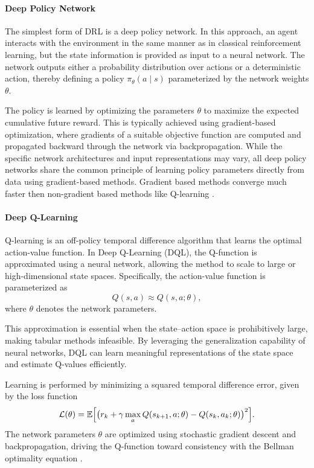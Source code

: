 \paragraph{Deep Policy Network}
The simplest form of DRL is a deep policy network. In this approach, an agent interacts with the environment in the same manner as in classical reinforcement learning, but the state information is provided as input to a neural network. The network outputs either a probability distribution over actions or a deterministic action, thereby defining a policy \( \pi_\theta(a \mid s) \) parameterized by the network weights \( \theta \).

The policy is learned by optimizing the parameters \( \theta \) to maximize the expected cumulative future reward. This is typically achieved using gradient-based optimization, where gradients of a suitable objective function are computed and propagated backward through the network via backpropagation. While the specific network architectures and input representations may vary, all deep policy networks share the common principle of learning policy parameters directly from data using gradient-based methods. Gradient based methods converge much faster then non-gradient based methods like Q-learning \cite{brunton2022data}.

\paragraph{Deep Q-Learning}
Q-learning is an off-policy temporal difference algorithm that learns the optimal action-value function. In Deep Q-Learning (DQL), the Q-function is approximated using a neural network, allowing the method to scale to large or high-dimensional state spaces. Specifically, the action-value function is parameterized as
\[
Q(s,a) \approx Q(s,a;\theta),
\]
where \( \theta \) denotes the network parameters.

This approximation is essential when the state–action space is prohibitively large, making tabular methods infeasible. By leveraging the generalization capability of neural networks, DQL can learn meaningful representations of the state space and estimate Q-values efficiently.

Learning is performed by minimizing a squared temporal difference error, given by the loss function
\[
\mathcal{L}(\theta)
=
\mathbb{E}\Bigl[
\bigl(
r_k + \gamma \max_a Q(s_{k+1},a;\theta)
-
Q(s_k,a_k;\theta)
\bigr)^2
\Bigr].
\]
The network parameters \( \theta \) are optimized using stochastic gradient descent and backpropagation, driving the Q-function toward consistency with the Bellman optimality equation \cite{brunton2022data}.


